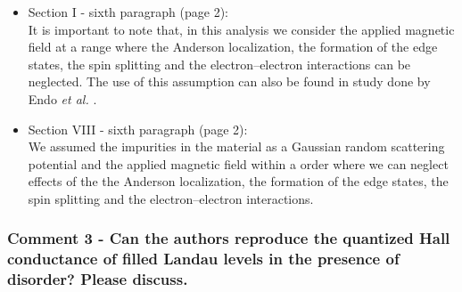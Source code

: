 \documentclass{article}
\begin{document}
\begin{itemize}
  \item Section I - sixth paragraph (page 2):\\
  {\color{Maroon}
  It is important to note that, in this analysis we consider the applied magnetic field at a range where the Anderson localization, the formation of the edge states, the spin splitting and the electron–electron interactions can be neglected. The use of this assumption can also be found in study done by  Endo \textit{et al.} \cite{endo09}.
  }
  \item Section VIII - sixth paragraph (page 2):\\
  {\color{Maroon}
  We assumed the impurities in the material as a Gaussian random scattering potential and the applied magnetic field within a order where we can neglect effects of the the Anderson localization, the formation of the edge states, the spin splitting and the electron–electron interactions.
  }
\end{itemize}


\subsubsection*{Comment 3 -
\color{RoyalBlue} Can the authors reproduce the quantized Hall conductance of filled Landau levels in the presence of disorder? Please discuss.
}
\end{document}
